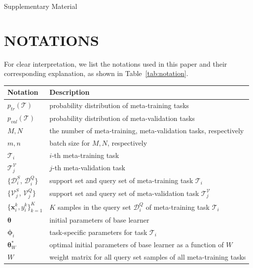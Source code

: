 \onecolumn
\begin{center}
    \Huge{Supplementary Material}
\end{center}

\section{NOTATIONS}
\label{app:notations}
For clear interpretation, we list the notations used in this paper and their corresponding explanation, as shown in Table~\ref{tab:notation}.

{\renewcommand{\arraystretch}{1.2} %
\begin{table}[ht!]
    \centering
    
    \begin{center}
    \begin{tabular}{ll}
        \toprule
        \bfseries{Notation} & \bfseries{Description}  \\
        \midrule
        $p_{tr}(\mathcal{T})$ & probability distribution of meta-training tasks  \\
        $p_{val}(\mathcal{T})$ & probability distribution of meta-validation tasks  \\
        $M, N$ & the number of meta-training, meta-validation tasks, respectively \\
        $m, n$ & batch size for $M, N$, respectively \\
        $\mathcal{T}_i$ & $i$-th meta-training task \\
        $\mathcal{T}_j^{\mathcal{V}}$ & $j$-th meta-validation task \\
        $\{\mathcal{D}_i^S$, $\mathcal{D}_i^Q\}$ & support set and query set of meta-training task $\mathcal{T}_i$ \\
        $\{\mathcal{V}_j^S$, $\mathcal{V}_j^Q\}$ & support set and query set of meta-validation task $\mathcal{T}_j^{\mathcal{V}}$\\
        $\{\boldsymbol{x}_i^k, {y}_i^k\}_{k=1}^K$ & $K$ samples in the query set $\mathcal{D}_i^Q$ of meta-training task $\mathcal{T}_i$\\
        $\boldsymbol{\theta}$  & initial parameters of base learner \\
        $\boldsymbol{\phi}_i$  & task-specific parameters for task $\mathcal{T}_i$ \\
        $\boldsymbol{\theta}_W^*$  & optimal initial parameters of base learner as a function of $W$\\
        $W$ & weight matrix for all query set samples of all meta-training tasks\\

\end{tabular}
\end{center}
\end{table}}
